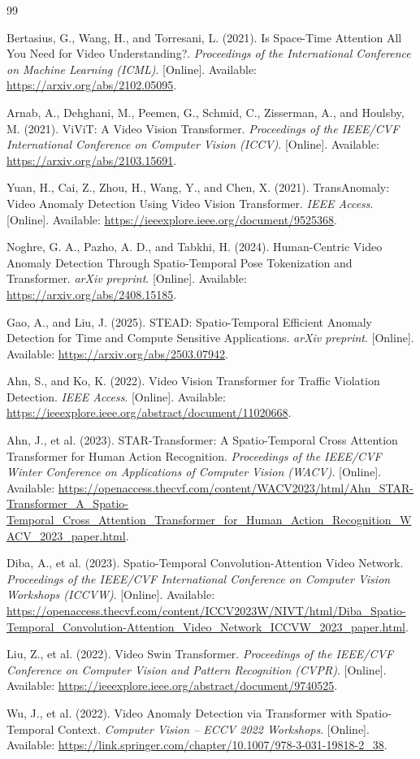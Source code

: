 \begin{thebibliography}{99}

 Bertasius, G., Wang, H., and Torresani, L. (2021). Is Space-Time Attention All You Need for Video Understanding?. \textit{Proceedings of the International Conference on Machine Learning (ICML)}. [Online]. Available: \url{https://arxiv.org/abs/2102.05095}.

 Arnab, A., Dehghani, M., Peemen, G., Schmid, C., Zisserman, A., and Houlsby, M. (2021). ViViT: A Video Vision Transformer. \textit{Proceedings of the IEEE/CVF International Conference on Computer Vision (ICCV)}. [Online]. Available: \url{https://arxiv.org/abs/2103.15691}.

 Yuan, H., Cai, Z., Zhou, H., Wang, Y., and Chen, X. (2021). TransAnomaly: Video Anomaly Detection Using Video Vision Transformer. \textit{IEEE Access}. [Online]. Available: \url{https://ieeexplore.ieee.org/document/9525368}.

 Noghre, G. A., Pazho, A. D., and Tabkhi, H. (2024). Human-Centric Video Anomaly Detection Through Spatio-Temporal Pose Tokenization and Transformer. \textit{arXiv preprint}. [Online]. Available: \url{https://arxiv.org/abs/2408.15185}.

 Gao, A., and Liu, J. (2025). STEAD: Spatio-Temporal Efficient Anomaly Detection for Time and Compute Sensitive Applications. \textit{arXiv preprint}. [Online]. Available: \url{https://arxiv.org/abs/2503.07942}.

 Ahn, S., and Ko, K. (2022). Video Vision Transformer for Traffic Violation Detection. \textit{IEEE Access}. [Online]. Available: \url{https://ieeexplore.ieee.org/abstract/document/11020668}.

 Ahn, J., et al. (2023). STAR-Transformer: A Spatio-Temporal Cross Attention Transformer for Human Action Recognition. \textit{Proceedings of the IEEE/CVF Winter Conference on Applications of Computer Vision (WACV)}. [Online]. Available: \url{https://openaccess.thecvf.com/content/WACV2023/html/Ahn_STAR-Transformer_A_Spatio-Temporal_Cross_Attention_Transformer_for_Human_Action_Recognition_WACV_2023_paper.html}.

 Diba, A., et al. (2023). Spatio-Temporal Convolution-Attention Video Network. \textit{Proceedings of the IEEE/CVF International Conference on Computer Vision Workshops (ICCVW)}. [Online]. Available: \url{https://openaccess.thecvf.com/content/ICCV2023W/NIVT/html/Diba_Spatio-Temporal_Convolution-Attention_Video_Network_ICCVW_2023_paper.html}.

 Liu, Z., et al. (2022). Video Swin Transformer. \textit{Proceedings of the IEEE/CVF Conference on Computer Vision and Pattern Recognition (CVPR)}. [Online]. Available: \url{https://ieeexplore.ieee.org/abstract/document/9740525}.

 Wu, J., et al. (2022). Video Anomaly Detection via Transformer with Spatio-Temporal Context. \textit{Computer Vision – ECCV 2022 Workshops}. [Online]. Available: \url{https://link.springer.com/chapter/10.1007/978-3-031-19818-2_38}.

\end{thebibliography}